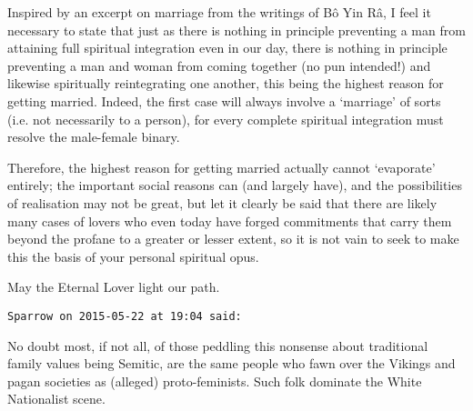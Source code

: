 \begin{footnotesize}
\begin{sffamily}
Inspired by an excerpt on marriage from the writings of Bô Yin Râ, I feel it necessary to state that just as there is nothing in principle preventing a man from attaining full spiritual integration even in our day, there is nothing in principle preventing a man and woman from coming together (no pun intended!) and likewise spiritually reintegrating one another, this being the highest reason for getting married. Indeed, the first case will always involve a `marriage' of sorts (i.e. not necessarily to a person), for every complete spiritual integration must resolve the male-female binary. 

Therefore, the highest reason for getting married actually cannot `evaporate' entirely; the important social reasons can (and largely have), and the possibilities of realisation may not be great, but let it clearly be said that there are likely many cases of lovers who even today have forged commitments that carry them beyond the profane to a greater or lesser extent, so it is not vain to seek to make this the basis of your personal spiritual opus.

May the Eternal Lover light our path.


\hfill

\texttt{Sparrow on 2015-05-22 at 19:04 said: }

No doubt most, if not all, of those peddling this nonsense about traditional family values being Semitic, are the same people who fawn over the Vikings and pagan societies as (alleged) proto-feminists. Such folk dominate the White Nationalist scene.


\end{sffamily}\end{footnotesize}
